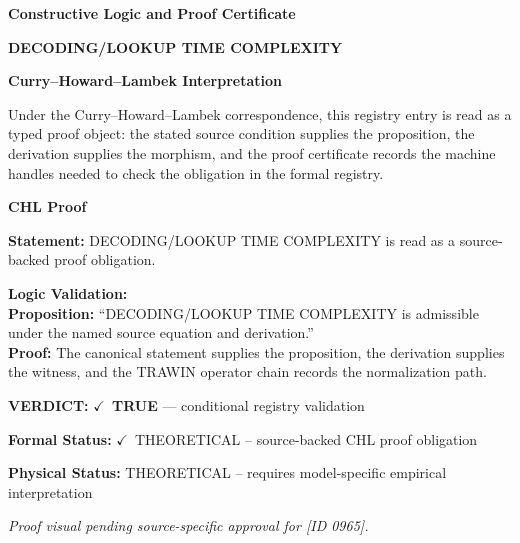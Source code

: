 \clearpage
\begingroup\tzpsupportsetup
\noindent\textbf{\fontsize{10.8pt}{12.8pt}\selectfont [ID 0965] Constructive Logic and Proof Certificate}\par
\noindent\textbf{\fontsize{10pt}{12pt}\selectfont DECODING/LOOKUP TIME COMPLEXITY}\par
\vspace{0.45em}
\begingroup
\footnotesize
\setlength{\parskip}{0.22em}
\setlength{\parindent}{0pt}
\noindent\textbf{Curry--Howard--Lambek Interpretation}\par
Under the Curry--Howard--Lambek correspondence, this registry entry is read as a typed proof
object: the stated source condition supplies the proposition, the derivation supplies the
morphism, and the proof certificate records the machine handles needed to check the obligation
in the formal registry.

\vspace{0.45em}
\noindent\textbf{CHL Proof}\par
\textbf{Statement:} DECODING/LOOKUP TIME COMPLEXITY is read as a source-backed proof obligation.

\textbf{Logic Validation:}\\
\textbf{Proposition:} ``DECODING/LOOKUP TIME COMPLEXITY is admissible under the named source equation and derivation.''\\
\textbf{Proof:} The canonical statement supplies the proposition, the derivation supplies the witness, and the TRAWIN operator chain records the normalization path.

\textbf{VERDICT:} \ensuremath{\checkmark}\ \textbf{TRUE} --- conditional registry validation

\textbf{Formal Status:} \ensuremath{\checkmark}\ THEORETICAL -- source-backed CHL proof obligation

\textbf{Physical Status:} THEORETICAL -- requires model-specific empirical interpretation
\par\vspace{0.45em}
\par
\vfill
\begingroup\footnotesize\itshape
Proof visual pending source-specific approval for [ID 0965].
\par\endgroup
\vfill
\endgroup
\endgroup
